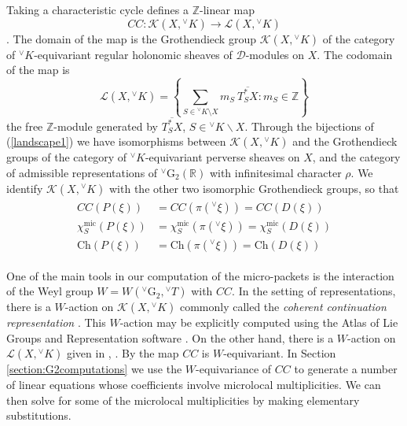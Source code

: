 \documentclass[a4paper, 11pt]{article}
\begin{document}
Taking a characteristic cycle defines a $\mathbb{Z}$-linear map
\begin{equation}
\label{eq:CC-map}
CC: \mathscr{K}(X, {^\vee}K) \rightarrow \mathscr{L}(X,
{^\vee}K)
\end{equation}
\cite[Theorem 2.2.3]{Hotta}.  The domain of the map is
the Grothendieck group $\mathscr{K}(X,{^\vee}K)$ of the category of
${^\vee}K$-equivariant regular holonomic sheaves of
$\mathcal{D}$-modules on $X$.  The codomain of the map is
\begin{equation}
\label{LXK} 
\mathscr{L}(X,{^\vee}K)=\left\{\sum_{S\in {^\vee}K\setminus
  X}m_S\ \overline{T^{\ast}_{S}X}:m_S\in\mathbb{Z}\right\}
\end{equation}
the free
$\mathbb{Z}$-module generated by $\overline{T^{*}_{S}X}$, $S \in
{^\vee}K \backslash X$.  Through the bijections of (\ref{landscape1})
we have isomorphisms between $\mathscr{K}(X, {^\vee}K)$ and the
Grothendieck groups of the category of
${^\vee}K$-equivariant perverse sheaves on $X$, and the
category of admissible representations of
${^\vee}\mathrm{G}_{2}(\mathbb{R})$ with infinitesimal character
$\rho$.  We identify $\mathscr{K}(X, {^\vee}K)$ with the other two
isomorphic Grothendieck groups,  so that
\begin{align} \label{eq:characteristicvariety}
\begin{aligned}
 CC(P(\xi)) &= CC(\pi({^\vee}\xi)) = CC(D(\xi))\\
 \chi^{\mathrm{mic}}_{S} (P(\xi)) &= \chi^{\mathrm{mic}}_{S}
(\pi({^\vee}\xi)) = \chi^{\mathrm{mic}}_{S} (D(\xi))\\ 
 \mathrm{Ch}(P(\xi)) &= \mathrm{Ch}(\pi({^\vee}\xi)) =
  \mathrm{Ch}(D(\xi))
  \end{aligned}
\end{align} 

One of the main tools in our computation of the micro-packets is the
interaction of the Weyl group $W = W({^\vee}\mathrm{G}_{2}, {^\vee}T)$
with $CC$.  In the setting of representations, there is a
$W$-action on $\mathscr{K}(X, {^\vee}K)$ commonly called the \emph{coherent
continuation representation} \cite[Definition 7.2.28]{greenbook}.  
This $W$-action may be explicitly computed using the Atlas of Lie Groups
and Representation software \cite{atlas}.  On the other hand, there is 
a $W$-action on $\mathscr{L}(X, {^\vee}K)$ given in
\cite{Hotta85}, \cite{Rossmann95}.  By \cite[Theorem 1]{Tanisaki} the
map $CC$ is $W$-equivariant.  In Section \ref{section:G2computations} we use the
$W$-equivariance of $CC$  to 
generate a number of linear equations whose coefficients involve microlocal
multiplicities.  We can then solve for some of the microlocal
multiplicities by making elementary substitutions.  
\end{document}
